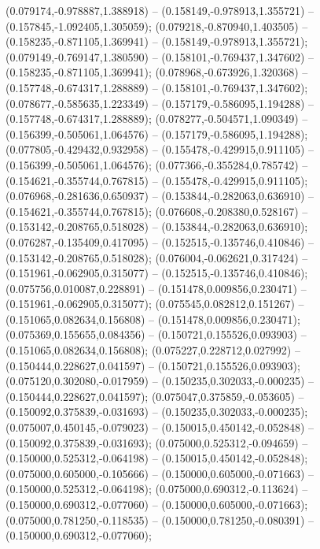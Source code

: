  (0.079174,-0.978887,1.388918) -- (0.158149,-0.978913,1.355721) -- (0.157845,-1.092405,1.305059);
 (0.079218,-0.870940,1.403505) -- (0.158235,-0.871105,1.369941) -- (0.158149,-0.978913,1.355721);
 (0.079149,-0.769147,1.380590) -- (0.158101,-0.769437,1.347602) -- (0.158235,-0.871105,1.369941);
 (0.078968,-0.673926,1.320368) -- (0.157748,-0.674317,1.288889) -- (0.158101,-0.769437,1.347602);
 (0.078677,-0.585635,1.223349) -- (0.157179,-0.586095,1.194288) -- (0.157748,-0.674317,1.288889);
 (0.078277,-0.504571,1.090349) -- (0.156399,-0.505061,1.064576) -- (0.157179,-0.586095,1.194288);
 (0.077805,-0.429432,0.932958) -- (0.155478,-0.429915,0.911105) -- (0.156399,-0.505061,1.064576);
 (0.077366,-0.355284,0.785742) -- (0.154621,-0.355744,0.767815) -- (0.155478,-0.429915,0.911105);
 (0.076968,-0.281636,0.650937) -- (0.153844,-0.282063,0.636910) -- (0.154621,-0.355744,0.767815);
 (0.076608,-0.208380,0.528167) -- (0.153142,-0.208765,0.518028) -- (0.153844,-0.282063,0.636910);
 (0.076287,-0.135409,0.417095) -- (0.152515,-0.135746,0.410846) -- (0.153142,-0.208765,0.518028);
 (0.076004,-0.062621,0.317424) -- (0.151961,-0.062905,0.315077) -- (0.152515,-0.135746,0.410846);
 (0.075756,0.010087,0.228891) -- (0.151478,0.009856,0.230471) -- (0.151961,-0.062905,0.315077);
 (0.075545,0.082812,0.151267) -- (0.151065,0.082634,0.156808) -- (0.151478,0.009856,0.230471);
 (0.075369,0.155655,0.084356) -- (0.150721,0.155526,0.093903) -- (0.151065,0.082634,0.156808);
 (0.075227,0.228712,0.027992) -- (0.150444,0.228627,0.041597) -- (0.150721,0.155526,0.093903);
 (0.075120,0.302080,-0.017959) -- (0.150235,0.302033,-0.000235) -- (0.150444,0.228627,0.041597);
 (0.075047,0.375859,-0.053605) -- (0.150092,0.375839,-0.031693) -- (0.150235,0.302033,-0.000235);
 (0.075007,0.450145,-0.079023) -- (0.150015,0.450142,-0.052848) -- (0.150092,0.375839,-0.031693);
 (0.075000,0.525312,-0.094659) -- (0.150000,0.525312,-0.064198) -- (0.150015,0.450142,-0.052848);
 (0.075000,0.605000,-0.105666) -- (0.150000,0.605000,-0.071663) -- (0.150000,0.525312,-0.064198);
 (0.075000,0.690312,-0.113624) -- (0.150000,0.690312,-0.077060) -- (0.150000,0.605000,-0.071663);
 (0.075000,0.781250,-0.118535) -- (0.150000,0.781250,-0.080391) -- (0.150000,0.690312,-0.077060);
